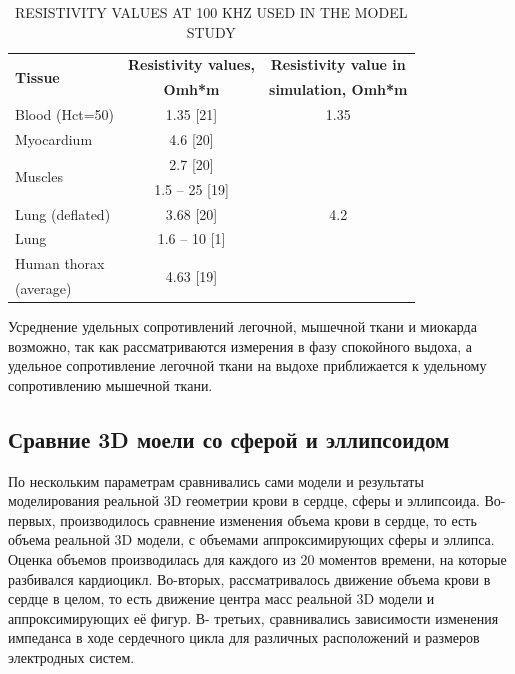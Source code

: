 \documentclass[conference]{IEEEtran}
\begin{document}
\begin{table}[htbp]
    \caption{RESISTIVITY VALUES AT 100 KHZ USED IN THE MODEL STUDY}
    \begin{center}
        \begin{tabular}{|l|c|c|}
            \hline
            \multirow{2}{*}{\textbf{Tissue}}              &     \textbf{Resistivity values,}      &    \textbf{Resistivity value in}  \\
            &    \textbf{ Omh*m}     &   \textbf{ simulation, Omh*m }\\
            \hline
            Blood (Hct=50)           & 1.35 [21]           & 1.35      \\
            \hline
            Myocardium               & 4.6 [20]       & \multirow{7}{*}{4.2}\\
            \cline{1-2}
            \multirow{2}{*}{Muscles} & 2.7 [20]          &     \\
            \cline{2-2}
            & 1.5 – 25 [19]           &   \\
            \cline{1-2}
            Lung (deflated)          & 3.68 [20]     &         \\
            \cline{1-2}
            Lung                     & 1.6 – 10 [1]       &    \\
            \cline{1-2}
            Human thorax & \multirow{2}{*}{4.63 [19]}  &   \\
            (average)   & &   \\
            \hline
        \end{tabular}
        \label{tab:table}
    \end{center}
\end{table}

Усреднение удельных сопротивлений легочной, мышечной ткани и миокарда возможно, так как рассматриваются измерения в фазу спокойного выдоха, а удельное сопротивление легочной ткани на выдохе приближается к удельному сопротивлению мышечной ткани.

\subsection{Сравние 3D моели со сферой и эллипсоидом}

По нескольким параметрам сравнивались сами модели и результаты моделирования реальной 3D геометрии крови в сердце, сферы и эллипсоида.
Во-первых, производилось сравнение изменения объема крови в сердце, то есть объема реальной 3D модели, с объемами аппроксимирующих сферы и эллипса. Оценка объемов производилась для каждого из 20 моментов времени, на которые разбивался кардиоцикл.
Во-вторых, рассматривалось движение объема крови в сердце в целом, то есть движение центра масс реальной 3D модели и аппроксимирующих её фигур.
В- третьих, сравнивались зависимости изменения импеданса в ходе сердечного цикла для различных расположений и размеров электродных систем.
\end{document}
